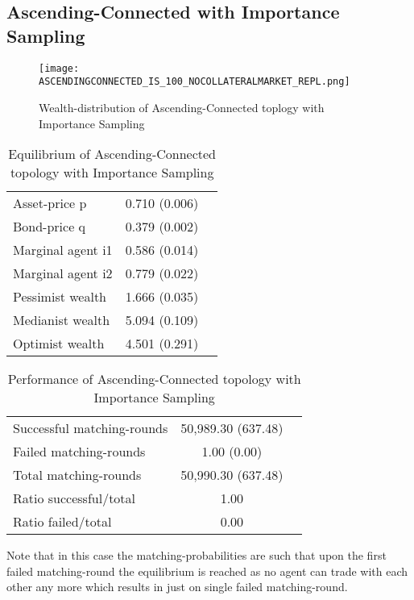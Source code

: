 \documentclass[Bachelorarbeit.tex]{subfiles}
\begin{document}
\subsection{Ascending-Connected with Importance Sampling}
\begin{figure}[H]
	\centering
  \texttt{[image: ASCENDINGCONNECTED\_IS\_100\_NOCOLLATERALMARKET\_REPL.png]}
	\caption{Wealth-distribution of Ascending-Connected toplogy with Importance Sampling}
	\label{fig:wealth_ASCENDINGCONNECTED_IS_100_NOCOLLATERALMARKET_REPL}
\end{figure}

\begin{table}[H]
	\caption{Equilibrium of Ascending-Connected topology with Importance Sampling}
	\centering
	\begin{tabular} { l c r }
		\hline
		Asset-price p & 0.710 (0.006) \\
		Bond-price q & 0.379 (0.002) \\
		Marginal agent i1 & 0.586 (0.014) \\
		Marginal agent i2 & 0.779 (0.022) \\
		\hline
		Pessimist wealth & 1.666 (0.035) \\
		Medianist wealth & 5.094 (0.109) \\
		Optimist wealth & 4.501 (0.291) \\
		\hline
	\end{tabular}
\end{table} 

\begin{table}[H]
	\caption{Performance of Ascending-Connected topology with Importance Sampling}
	\centering
	\begin{tabular} { l c r }
		\hline
		Successful matching-rounds & 50,989.30 (637.48) \\
		Failed matching-rounds & 1.00 (0.00) \\
		Total matching-rounds & 50,990.30 (637.48) \\
		\hline
		Ratio successful/total & 1.00 \\
		Ratio failed/total & 0.00 \\
		\hline
	\end{tabular}
\end{table}

Note that in this case the matching-probabilities are such that upon the first failed matching-round the equilibrium is reached as no agent can trade with each other any more which results in just on single failed matching-round.
\end{document}
